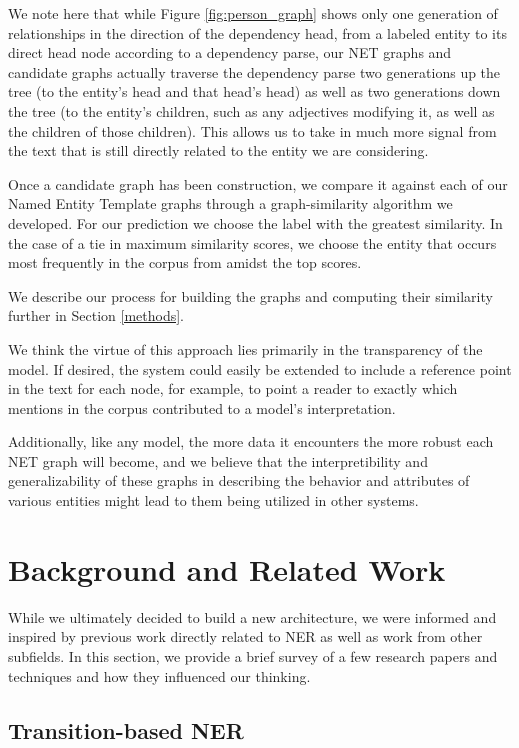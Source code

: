 \documentclass[11pt,a4paper]{article}
\begin{document}
We note here that while Figure \ref{fig:person_graph} shows only one generation of relationships in the direction of the dependency head, from a labeled entity to its direct head node according to a dependency parse, our NET graphs and candidate graphs actually traverse the dependency parse two generations up the tree (to the entity's head and that head's head) as well as two generations down the tree (to the entity's children, such as any adjectives modifying it, as well as the children of those children). This allows us to take in much more signal from the text that is still directly related to the entity we are considering.

Once a candidate graph has been construction, we compare it against each of our Named Entity Template graphs through a graph-similarity algorithm we developed. For our prediction we choose the label with the greatest similarity. In the case of a tie in maximum similarity scores, we choose the entity that occurs most frequently in the corpus from amidst the top scores.

We describe our process for building the graphs and computing their similarity further in Section \ref{methods}.

We think the virtue of this approach lies primarily in the transparency of the model. If desired, the system could easily be extended to include a reference point in the text for each node, for example, to point a reader to exactly which mentions in the corpus contributed to a model's interpretation.

Additionally, like any model, the more data it encounters the more robust each NET graph will become, and we believe that the interpretibility and generalizability of these graphs in describing the behavior and attributes of various entities might lead to them being utilized in other systems.

\section{Background and Related Work} \label{background}

While we ultimately decided to build a new architecture, we were informed and inspired by previous work directly related to NER as well as work from other subfields. In this section, we provide a brief survey of a few research papers and techniques and how they influenced our thinking.

\subsection{Transition-based NER}
\end{document}
